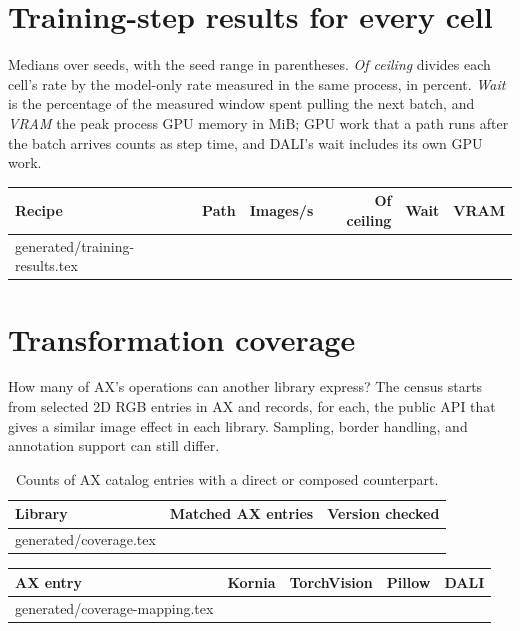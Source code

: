 \documentclass[11pt]{article}
\makeatletter
\let\inputrows\@@input
\makeatother
\begin{document}
\clearpage
\section{Training-step results for every cell}
\label{app:training}

Medians over \SeedCount{} seeds, with the seed range in parentheses. \emph{Of ceiling} divides each
cell's rate by the model-only rate measured in the same process, in percent. \emph{Wait} is the
percentage of the measured window spent pulling the next batch, and \emph{VRAM} the peak process
GPU memory in MiB; GPU work that a path runs after the batch arrives
counts as step time, and DALI's wait includes its own GPU work.

\begingroup\small
{}
\begin{longtable}{P{3.4cm}P{2.8cm}rrrr}
\textbf{Recipe} & \textbf{Path} & \textbf{Images/s} & \textbf{Of ceiling} & \textbf{Wait} &
\textbf{VRAM} \\ \midrule\endhead
\inputrows generated/training-results.tex
\bottomrule
\end{longtable}
\endgroup

\clearpage
\section{Transformation coverage}
\label{app:coverage}

How many of AX's operations can another library express? The census starts from
\CoverageAlbumentationsX{} selected 2D RGB entries in AX and records, for each, the public API that
gives a similar image effect in each library. Sampling, border handling, and annotation support
can still differ.

\begin{table}[H]
\centering
{}
\begin{tabular}{lrr}
\textbf{Library} & \textbf{Matched AX entries} & \textbf{Version checked} \\ \midrule
\inputrows generated/coverage.tex
\bottomrule
\end{tabular}
\caption{Counts of AX catalog entries with a direct or composed counterpart.}
\label{tab:coverage}
\end{table}

\begingroup\small
{}
\begin{longtable}{P{3.2cm}P{3.0cm}P{2.7cm}P{2.7cm}P{3.3cm}}
\textbf{AX entry} & \textbf{Kornia} & \textbf{TorchVision} & \textbf{Pillow} & \textbf{DALI} \\ \midrule\endhead
\inputrows generated/coverage-mapping.tex
\bottomrule
\end{longtable}
\endgroup
\end{document}
